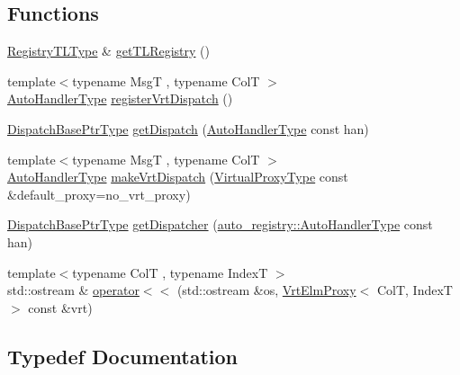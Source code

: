 \subsection*{Functions}
\begin{DoxyCompactItemize}
\item 
\hyperlink{namespacevt_1_1vrt_1_1collection_aecdad7ed4df3be1bab2a6bb9c5945964}{Registry\+T\+L\+Type} \& \hyperlink{namespacevt_1_1vrt_1_1collection_a37734c53d0e2984a2f914b4d0561ea30}{get\+T\+L\+Registry} ()
\item 
{\footnotesize template$<$typename MsgT , typename ColT $>$ }\\\hyperlink{namespacevt_1_1vrt_1_1collection_af50831782f9d77f86d626f858f295c37}{Auto\+Handler\+Type} \hyperlink{namespacevt_1_1vrt_1_1collection_a649287c1f71fd197febb94ecafbb3ca8}{register\+Vrt\+Dispatch} ()
\item 
\hyperlink{namespacevt_1_1vrt_1_1collection_aa3b9731ae16d60fac43d68840f3606a5}{Dispatch\+Base\+Ptr\+Type} \hyperlink{namespacevt_1_1vrt_1_1collection_a5d5e4ddb8eeaea0b7d0d5ff6917a829e}{get\+Dispatch} (\hyperlink{namespacevt_1_1vrt_1_1collection_af50831782f9d77f86d626f858f295c37}{Auto\+Handler\+Type} const han)
\item 
{\footnotesize template$<$typename MsgT , typename ColT $>$ }\\\hyperlink{namespacevt_1_1vrt_1_1collection_af50831782f9d77f86d626f858f295c37}{Auto\+Handler\+Type} \hyperlink{namespacevt_1_1vrt_1_1collection_ae4a11c02df4ec2be06edba8ecca82683}{make\+Vrt\+Dispatch} (\hyperlink{namespacevt_a1b417dd5d684f045bb58a0ede70045ac}{Virtual\+Proxy\+Type} const \&default\+\_\+proxy=no\+\_\+vrt\+\_\+proxy)
\item 
\hyperlink{namespacevt_1_1vrt_1_1collection_aa3b9731ae16d60fac43d68840f3606a5}{Dispatch\+Base\+Ptr\+Type} \hyperlink{namespacevt_1_1vrt_1_1collection_aba53c1c5f5d08b1ca34097046d285a79}{get\+Dispatcher} (\hyperlink{namespacevt_1_1auto__registry_ae295e18699146815bb7d7674594d95d7}{auto\+\_\+registry\+::\+Auto\+Handler\+Type} const han)
\item 
{\footnotesize template$<$typename ColT , typename IndexT $>$ }\\std\+::ostream \& \hyperlink{namespacevt_1_1vrt_1_1collection_a45a536f39c0184e25512607398b7c364}{operator$<$$<$} (std\+::ostream \&os, \hyperlink{structvt_1_1vrt_1_1collection_1_1_vrt_elm_proxy}{Vrt\+Elm\+Proxy}$<$ ColT, IndexT $>$ const \&vrt)
\end{DoxyCompactItemize}


\subsection{Typedef Documentation}
\mbox{\label{namespacevt_1_1vrt_1_1collection_ab2e800e37837a2afe33996fe8f5fabea}} 
